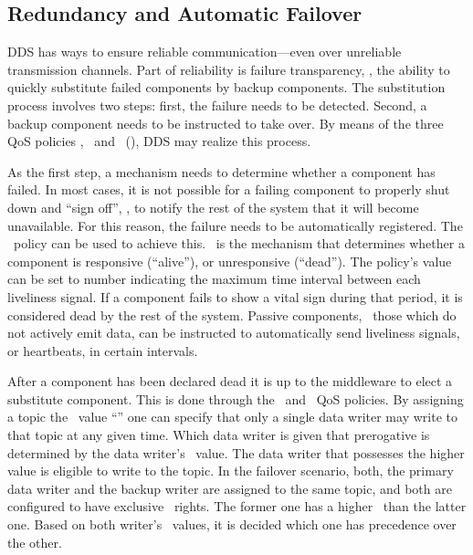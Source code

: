 \subsection{Redundancy and Automatic Failover} \label{sec:failover}
DDS has ways to ensure reliable communication---even over unreliable transmission channels. Part of reliability is failure transparency, \ie , the ability to quickly substitute failed components by backup components. The substitution process involves two steps: first, the failure needs to be detected. Second, a backup component needs to be instructed to take over. By means of the three QoS policies \ownership , \ostrength\ and \liveliness\ (\cf {}), DDS may realize this process.

As the first step, a mechanism needs to determine whether a component has failed. In most cases, it is not possible for a failing component to properly shut down and ``sign off'', \ie , to notify the rest of the system that it will become unavailable. For this reason, the failure needs to be automatically registered. The \liveliness\ policy can be used to achieve this. \liveliness\ is the mechanism that determines whether a component is responsive (``alive''), or unresponsive (``dead''). The policy's value can be set to number indicating the maximum time interval between each liveliness signal. If a component fails to show a vital sign during that period, it is considered dead by the rest of the system. Passive components, \ie\ those which do not actively emit data, can be instructed to automatically send liveliness signals, or heartbeats, in certain intervals.

After a component has been declared dead it is up to the middleware to elect a substitute component. This is done through the \ownership\ and \ostrength\ QoS policies. By assigning a topic the \ownership\ value ``'' one can specify that only a single data writer may write to that topic at any given time. Which data writer is given that prerogative is determined by the data writer's \ostrength\ value. The data writer that possesses the higher value is eligible to write to the topic. In the failover scenario, both, the primary data writer and the backup writer are assigned to the same topic, and both are configured to have exclusive \ownership\ rights. The former one has a higher \ostrength\ than the latter one. Based on both writer's \ostrength\ values, it is decided which one has precedence over the other.
%
%
%
%
%
%
%
%
%
%
%
%

